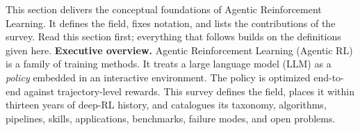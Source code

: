This section delivers the conceptual foundations of Agentic Reinforcement Learning. It defines the field, fixes notation, and lists the contributions of the survey. Read this section first; everything that follows builds on the definitions given here. \textbf{Executive overview.} Agentic Reinforcement Learning (Agentic RL) is a family of training methods. It treats a large language model (LLM) as a \emph{policy} embedded in an interactive environment. The policy is optimized end-to-end against trajectory-level rewards. This survey defines the field, places it within thirteen years of deep-RL history, and catalogues its taxonomy, algorithms, pipelines, skills, applications, benchmarks, failure modes, and open problems.
